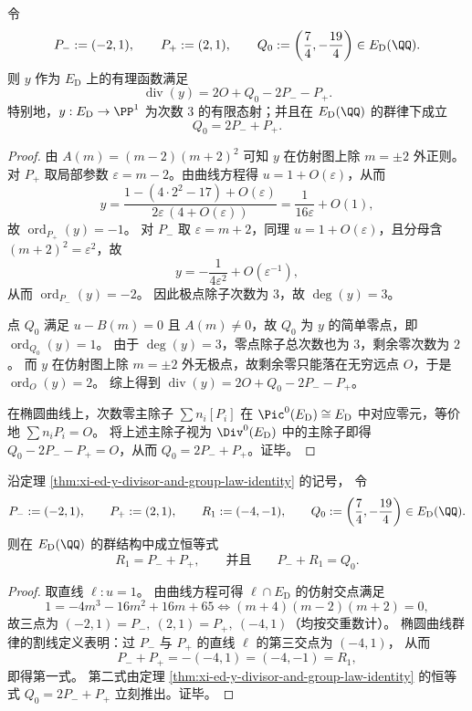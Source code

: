 \begin{theorem}\label{thm:xi-ed-y-divisor-and-group-law-identity}
令
\[
P_{-}:=(-2,1),\qquad P_{+}:=(2,1),\qquad Q_{0}:=\left(\frac74,-\frac{19}{4}\right)\in E_{\mathrm D}(\QQ).
\]
则 \(y\) 作为 \(E_{\mathrm D}\) 上的有理函数满足
\[
\operatorname{div}(y)=2O+Q_{0}-2P_{-}-P_{+}.
\]
特别地，\(y:E_{\mathrm D}\to\PP^1\) 为次数 \(3\) 的有限态射；并且在 \(E_{\mathrm D}(\QQ)\) 的群律下成立
\[
Q_{0}=2P_{-}+P_{+}.
\]
\end{theorem}
\begin{proof}
由 \(A(m)=(m-2)(m+2)^2\) 可知 \(y\) 在仿射图上除 \(m=\pm 2\) 外正则。
对 \(P_{+}\) 取局部参数 \(\varepsilon=m-2\)。由曲线方程得 \(u=1+O(\varepsilon)\)，从而
\[
y=\frac{1-(4\cdot 2^{2}-17)+O(\varepsilon)}{2\varepsilon\,(4+O(\varepsilon))}
=\frac{1}{16\varepsilon}+O(1),
\]
故 \(\operatorname{ord}_{P_{+}}(y)=-1\)。
对 \(P_{-}\) 取 \(\varepsilon=m+2\)，同理 \(u=1+O(\varepsilon)\)，且分母含 \((m+2)^2=\varepsilon^2\)，故
\[
y=-\frac{1}{4\varepsilon^{2}}+O(\varepsilon^{-1}),
\]
从而 \(\operatorname{ord}_{P_{-}}(y)=-2\)。
因此极点除子次数为 \(3\)，故 \(\deg(y)=3\)。
\par
点 \(Q_{0}\) 满足 \(u-B(m)=0\) 且 \(A(m)\neq 0\)，故 \(Q_{0}\) 为 \(y\) 的简单零点，即 \(\operatorname{ord}_{Q_{0}}(y)=1\)。
由于 \(\deg(y)=3\)，零点除子总次数也为 \(3\)，剩余零次数为 \(2\)。
而 \(y\) 在仿射图上除 \(m=\pm 2\) 外无极点，故剩余零只能落在无穷远点 \(O\)，于是 \(\operatorname{ord}_{O}(y)=2\)。
综上得到
\(
\operatorname{div}(y)=2O+Q_{0}-2P_{-}-P_{+}
\)。
\par
在椭圆曲线上，次数零主除子 \(\sum n_i[P_i]\) 在 \(\Pic^0(E_{\mathrm D})\cong E_{\mathrm D}\) 中对应零元，等价地 \(\sum n_iP_i=O\)。
将上述主除子视为 \(\Div^0(E_{\mathrm D})\) 中的主除子即得 \(Q_{0}-2P_{-}-P_{+}=O\)，从而 \(Q_{0}=2P_{-}+P_{+}\)。证毕。
\end{proof}

\begin{theorem}[三条有理分歧点之间的群律刚性关系]\label{thm:xi-ed-rational-branchpoints-group-law-rigidity}
沿定理 \ref{thm:xi-ed-y-divisor-and-group-law-identity} 的记号，
令
\[
P_-:=(-2,1),\qquad P_+:=(2,1),\qquad R_1:=(-4,-1),\qquad Q_0:=\left(\frac74,-\frac{19}{4}\right)\in E_{\mathrm D}(\QQ).
\]
则在 \(E_{\mathrm D}(\QQ)\) 的群结构中成立恒等式
\[
R_1=P_-+P_+,
\qquad\text{并且}\qquad
P_-+R_1=Q_0.
\]
\end{theorem}
\begin{proof}
取直线 \(\ell:u=1\)。
由曲线方程可得 \(\ell\cap E_{\mathrm D}\) 的仿射交点满足
\[
1=-4m^3-16m^2+16m+65
\iff
(m+4)(m-2)(m+2)=0,
\]
故三点为
\(
(-2,1)=P_-,\ (2,1)=P_+,\ (-4,1)
\)（均按交重数计）。
椭圆曲线群律的割线定义表明：过 \(P_-\) 与 \(P_+\) 的直线 \(\ell\) 的第三交点为 \((-4,1)\)，
从而
\[
P_-+P_+=-(-4,1)=(-4,-1)=R_1,
\]
即得第一式。
第二式由定理 \ref{thm:xi-ed-y-divisor-and-group-law-identity} 的恒等式 \(Q_0=2P_-+P_+\) 立刻推出。证毕。
\end{proof}

